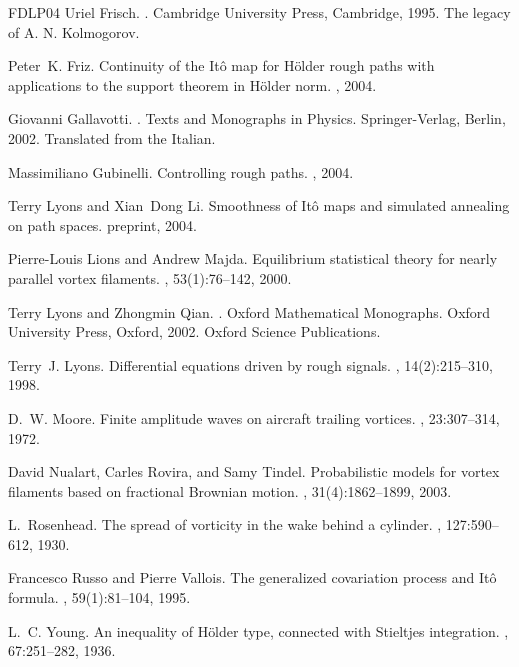 \documentclass[a4paper,12pt,reqno]{amsart}
\begin{document}
\begin{thebibliography}{FDLP04}
Uriel Frisch.
.
\newblock Cambridge University Press, Cambridge, 1995.
\newblock The legacy of A. N. Kolmogorov.

Peter~K. Friz.
\newblock Continuity of the {I}t\^o map for {H}\"older rough paths with
  applications to the support theorem in {H}\"older norm.
, 2004.

Giovanni Gallavotti.
.
\newblock Texts and Monographs in Physics. Springer-Verlag, Berlin, 2002.
\newblock Translated from the Italian.

Massimiliano Gubinelli.
\newblock Controlling rough paths.
, 2004.

Terry Lyons and Xian~Dong Li.
\newblock Smoothness of {I}t\^o maps and simulated annealing on path spaces.
\newblock preprint, 2004.

Pierre-Louis Lions and Andrew Majda.
\newblock Equilibrium statistical theory for nearly parallel vortex filaments.
, 53(1):76--142, 2000.

Terry Lyons and Zhongmin Qian.
.
\newblock Oxford Mathematical Monographs. Oxford University Press, Oxford,
  2002.
\newblock Oxford Science Publications.

Terry~J. Lyons.
\newblock Differential equations driven by rough signals.
, 14(2):215--310, 1998.

D.~W. Moore.
\newblock Finite amplitude waves on aircraft trailing vortices.
, 23:307--314, 1972.

David Nualart, Carles Rovira, and Samy Tindel.
\newblock Probabilistic models for vortex filaments based on fractional
  {B}rownian motion.
, 31(4):1862--1899, 2003.

L.~Rosenhead.
\newblock The spread of vorticity in the wake behind a cylinder.
, 127:590--612, 1930.

Francesco Russo and Pierre Vallois.
\newblock The generalized covariation process and {I}t\^o formula.
, 59(1):81--104, 1995.

L.~C. Young.
\newblock An inequality of {H}\"older type, connected with {S}tieltjes
  integration.
, 67:251--282, 1936.

\end{thebibliography}
\end{document}
